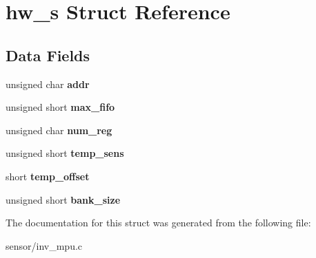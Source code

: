 \hypertarget{structhw__s}{}\section{hw\+\_\+s Struct Reference}
\label{structhw__s}
\subsection*{Data Fields}
\begin{DoxyCompactItemize}
\item 
unsigned char {\bfseries addr}\hypertarget{structhw__s_a4c34a946600e9d68b6355d23f54d291b}{}\label{structhw__s_a4c34a946600e9d68b6355d23f54d291b}

\item 
unsigned short {\bfseries max\+\_\+fifo}\hypertarget{structhw__s_a36e9e2aea952cea137504c539cdb97dc}{}\label{structhw__s_a36e9e2aea952cea137504c539cdb97dc}

\item 
unsigned char {\bfseries num\+\_\+reg}\hypertarget{structhw__s_a0c4fc172c338358ef1754c16c627eb08}{}\label{structhw__s_a0c4fc172c338358ef1754c16c627eb08}

\item 
unsigned short {\bfseries temp\+\_\+sens}\hypertarget{structhw__s_ab73e7066167ecd424b3a619cddd0939a}{}\label{structhw__s_ab73e7066167ecd424b3a619cddd0939a}

\item 
short {\bfseries temp\+\_\+offset}\hypertarget{structhw__s_ac3cd6878189d0ca0cb389c5ab11c8395}{}\label{structhw__s_ac3cd6878189d0ca0cb389c5ab11c8395}

\item 
unsigned short {\bfseries bank\+\_\+size}\hypertarget{structhw__s_a9e26f1784621a59cabcbfff28dc0b8ba}{}\label{structhw__s_a9e26f1784621a59cabcbfff28dc0b8ba}

\end{DoxyCompactItemize}


The documentation for this struct was generated from the following file\+:\begin{DoxyCompactItemize}
\item 
sensor/inv\+\_\+mpu.\+c\end{DoxyCompactItemize}

